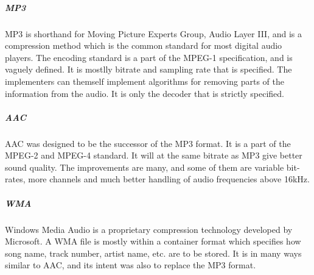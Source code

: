 \subparagraph{MP3} \hfill
\newline
MP3 is shorthand for Moving Picture Experts Group, Audio Layer III, and is a compression method which is the common standard for most digital audio players. The encoding standard is a part of the MPEG-1 specification, and is vaguely defined. It is mostlly bitrate and sampling rate that is specified. The implementers can themself implement algorithms for removing parts of the information from the audio. It is only the decoder that is strictly specified.
\cite{bib:MP3}


\subparagraph{AAC}\hfill
\newline
AAC was designed to be the successor of the MP3 format. It is a part of the MPEG-2 and MPEG-4 standard. It will at the same bitrate as MP3 give better sound quality. The improvements are many, and some of them are variable bit-rates, more channels  and much better handling of audio frequencies above 16kHz.
\cite{bib:AAC}


\subparagraph{WMA} \hfill
\newline
Windows Media Audio is a proprietary compression technology developed by Microsoft. A WMA file is mostly within a container format which specifies how song name, track number, artist name, etc. are to be stored. It is in many ways similar to AAC, and its intent was also to replace the MP3 format.
\cite{bib:WMA}

\newpage

